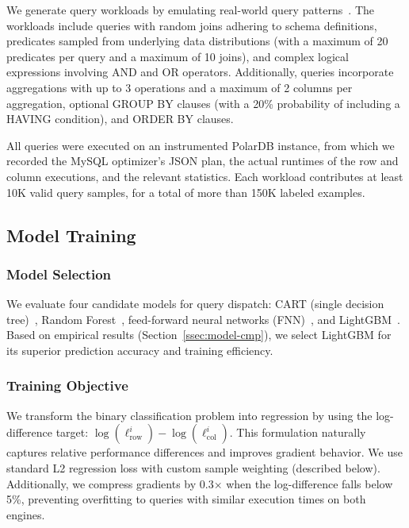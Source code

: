 \documentclass[sigconf, nonacm]{acmart}
\begin{document}
We generate query workloads by emulating real-world query patterns~\cite{hilprecht2022zero}. 
The workloads include queries with random joins adhering to schema definitions, predicates sampled from underlying data distributions (with a maximum of 20 predicates per query and a maximum of 10 joins), and complex logical expressions involving {AND} and {OR} operators. 
Additionally, queries incorporate aggregations with up to 3 operations and a maximum of 2 columns per aggregation, optional {GROUP BY} clauses (with a 20\% probability of including a {HAVING} condition), and {ORDER BY} clauses. 

All queries were executed on an instrumented PolarDB instance, from which we recorded the MySQL optimizer’s JSON plan, the actual runtimes of the row and column executions, and the relevant statistics. Each workload contributes at least 10K valid query samples, for a total of more than 150K labeled examples.



\subsection{Model Training}\label{ssec:model_training}

\subsubsection{Model Selection}
We evaluate four candidate models for query dispatch: CART (single decision tree)~\cite{loh2011classification}, Random Forest~\cite{breiman2001random}, feed-forward neural networks (FNN)~\cite{rumelhart1986learning,nissen2003fann}, and LightGBM~\cite{ke2017lightgbm}. Based on empirical results (Section~\ref{ssec:model-cmp}), we select LightGBM for its superior prediction accuracy and training efficiency.

\subsubsection{Training Objective}
We transform the binary classification problem into regression by using the log-difference target: $\log(\ell_{\text{row}}^i) - \log(\ell_{\text{col}}^i)$. This formulation naturally captures relative performance differences and improves gradient behavior. We use standard L2 regression loss with custom sample weighting (described below). Additionally, we compress gradients by 0.3× when the log-difference falls below 5\%, preventing overfitting to queries with similar execution times on both engines.
\end{document}

